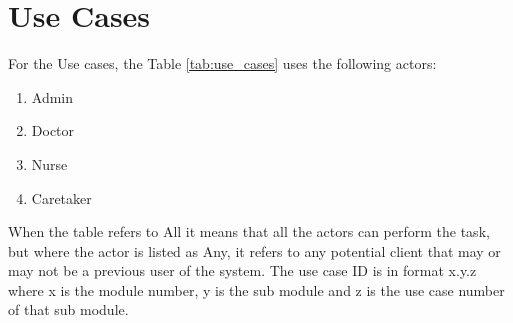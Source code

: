 \section{Use Cases}
For the Use cases, the Table \ref{tab:use_cases} uses the following actors:
\begin{enumerate}
    \item Admin
    \item Doctor
    \item Nurse
    \item Caretaker
\end{enumerate}
When the table refers to All it means that all the actors can perform the task, but where the actor is listed as Any, it refers to any potential client that may or may not be a previous user of the system. The use case ID is in format x.y.z where x is the module number, y is the sub module and z is the use case number of that sub module.
